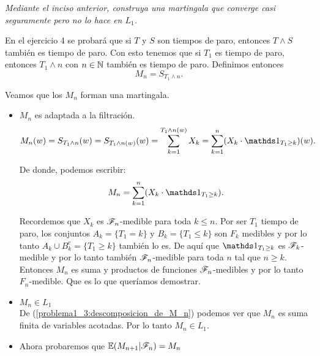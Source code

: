 \emph
{	
	Mediante el inciso anterior, construya una martingala que converge 
	casi seguramente pero no lo hace en $L_1$.\\
}
	
	En el ejercicio 4 se probará que si $T$ y $S$ son tiempos de paro, entonces $T\wedge S$ también 
	es tiempo de paro. Con esto tenemos que si $T_1$ es tiempo de paro, entonces $T_1 \wedge n$ con 
	$n \in \mathbb{N}$ también es tiempo de paro. Definimos entonces 
	$$M_n = S_{T_1 \wedge n}.$$
	
	Veamos que los $M_n$ forman una martingala.
	
	\begin{itemize}
		\item 
			$M_n$ es adaptada a la filtración.
			\begin{align}
				M_n(w) = S_{T_1 \wedge n}(w) = 
				S_{T_1 \wedge n (w)}(w) = 
				\sum_{k=1}^{T_1 \wedge n (w)} X_k = 
				\sum_{k=1}^{n} (X_k \cdot \indic_{T_1 \geq k})(w).
			\end{align}
			
			De donde, podemos escribir:
			\begin{align}\label{problema1_3:descomposicion_de_M_n}
				M_n = \sum_{k=1}^{n} (X_k \cdot \indic_{T_1 \geq k}).
			\end{align}								 		
			
			Recordemos que $X_k$ es $\mathscr{F}_n$-medible para toda $k \leq n $. Por ser
			$T_1$ tiempo de paro, los conjuntos $A_k = \{T_1 = k\}$ y 
			$B_k = \{T_1 \leq k\}$	son $F_k$ medibles y por lo tanto 
			$A_k \cup B_k^c = \{ T_1 \geq k\}$ también lo es. De aquí que 
			$\indic_{T_1 \geq k}$ es $\mathscr{F}_k$-medible y por lo tanto también $\mathscr{F}_n$-medible
			para toda $n$ tal que $n \geq k$.\\
			  
			Entonces $M_n$ es suma y productos de funciones $\mathscr{F}_n$-medibles y por lo tanto
			$F_n$-medible. Que es lo que queríamos demostrar.\\
			
		\item
			$M_n \in L_1$\\
			
			De (\ref{problema1_3:descomposicion_de_M_n}) podemos ver que $M_n$ es 
			suma finita de variables acotadas. Por lo tanto $M_n \in L_1$.\\
			
		\item Ahora probaremos que	$\mathbb{E}(M_{n+1} | \mathscr{F}_{n}) = M_{n}$\\
			

\end{itemize}
